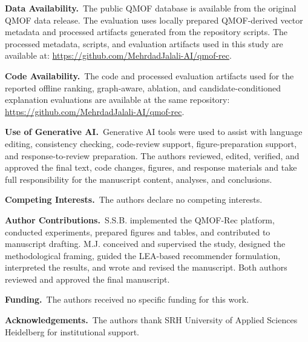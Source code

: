 \documentclass[12pt,a4paper]{article}
\begin{document}
\noindent\textbf{Data Availability.}\ The public QMOF database is available from the original QMOF data release. The evaluation uses locally prepared QMOF-derived vector metadata and processed artifacts generated from the repository scripts. The processed metadata, scripts, and evaluation artifacts used in this study are available at: \url{https://github.com/MehrdadJalali-AI/qmof-rec}.

\noindent\textbf{Code Availability.}\ The code and processed evaluation artifacts used for the reported offline ranking, graph-aware, ablation, and candidate-conditioned explanation evaluations are available at the same repository: \url{https://github.com/MehrdadJalali-AI/qmof-rec}.

\noindent\textbf{Use of Generative AI.}\ Generative AI tools were used to assist with language editing, consistency checking, code-review support, figure-preparation support, and response-to-review preparation. The authors reviewed, edited, verified, and approved the final text, code changes, figures, and response materials and take full responsibility for the manuscript content, analyses, and conclusions.

\noindent\textbf{Competing Interests.}\ The authors declare no competing interests.

\noindent\textbf{Author Contributions.}\ S.S.B. implemented the QMOF-Rec platform, conducted experiments, prepared figures and tables, and contributed to manuscript drafting. M.J. conceived and supervised the study, designed the methodological framing, guided the LEA-based recommender formulation, interpreted the results, and wrote and revised the manuscript. Both authors reviewed and approved the final manuscript.

\noindent\textbf{Funding.}\ The authors received no specific funding for this work.

\noindent\textbf{Acknowledgements.}\ The authors thank SRH University of Applied Sciences Heidelberg for institutional support.
\end{document}
